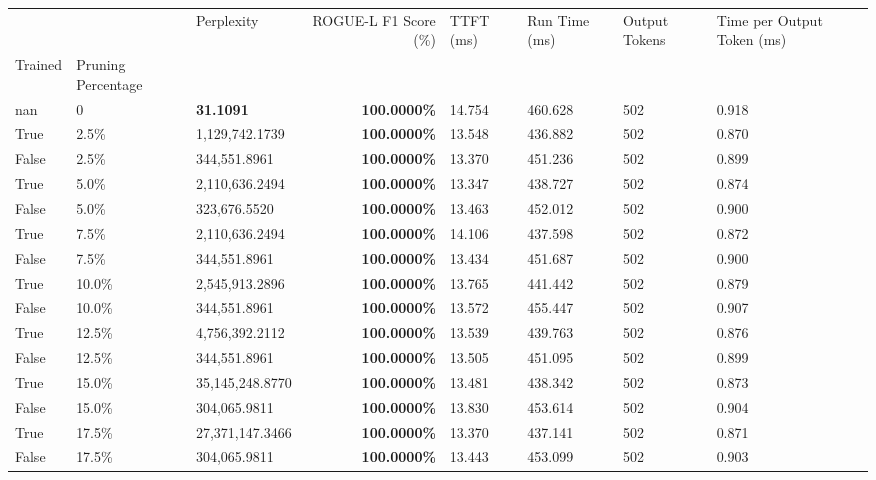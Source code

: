 \begin{table}[H]
\label{tab:evaluation-pipeline-11}
\begin{tabular}{lllrllll}
\toprule
 &  & Perplexity & ROGUE-L F1 Score (\%) & TTFT (ms) & Run Time (ms) & Output Tokens & Time per Output Token (ms) \\
Trained & Pruning Percentage &  &  &  &  &  &  \\
\midrule
nan & 0 & \bfseries 31.1091 & \bfseries 100.0000\% & 14.754 & 460.628 & 502 & 0.918 \\
\cline{1-8}
True & 2.5\% & 1,129,742.1739 & \bfseries \color{red} 100.0000\% & 13.548 & 436.882 & 502 & 0.870 \\
\cline{1-8}
False & 2.5\% & 344,551.8961 & \bfseries \color{red} 100.0000\% & 13.370 & 451.236 & 502 & 0.899 \\
\cline{1-8}
True & 5.0\% & 2,110,636.2494 & \bfseries \color{red} 100.0000\% & 13.347 & 438.727 & 502 & 0.874 \\
\cline{1-8}
False & 5.0\% & 323,676.5520 & \bfseries \color{red} 100.0000\% & 13.463 & 452.012 & 502 & 0.900 \\
\cline{1-8}
True & 7.5\% & 2,110,636.2494 & \bfseries \color{red} 100.0000\% & 14.106 & 437.598 & 502 & 0.872 \\
\cline{1-8}
False & 7.5\% & 344,551.8961 & \bfseries \color{red} 100.0000\% & 13.434 & 451.687 & 502 & 0.900 \\
\cline{1-8}
True & 10.0\% & 2,545,913.2896 & \bfseries \color{red} 100.0000\% & 13.765 & 441.442 & 502 & 0.879 \\
\cline{1-8}
False & 10.0\% & 344,551.8961 & \bfseries \color{red} 100.0000\% & 13.572 & 455.447 & 502 & 0.907 \\
\cline{1-8}
True & 12.5\% & 4,756,392.2112 & \bfseries \color{red} 100.0000\% & 13.539 & 439.763 & 502 & 0.876 \\
\cline{1-8}
False & 12.5\% & 344,551.8961 & \bfseries \color{red} 100.0000\% & 13.505 & 451.095 & 502 & 0.899 \\
\cline{1-8}
True & 15.0\% & 35,145,248.8770 & \bfseries \color{red} 100.0000\% & 13.481 & 438.342 & 502 & 0.873 \\
\cline{1-8}
False & 15.0\% & \color{red} 304,065.9811 & \bfseries \color{red} 100.0000\% & 13.830 & 453.614 & 502 & 0.904 \\
\cline{1-8}
True & 17.5\% & 27,371,147.3466 & \bfseries \color{red} 100.0000\% & 13.370 & 437.141 & 502 & 0.871 \\
\cline{1-8}
False & 17.5\% & \color{red} 304,065.9811 & \bfseries \color{red} 100.0000\% & 13.443 & 453.099 & 502 & 0.903 \\

\end{tabular}
\end{table}
